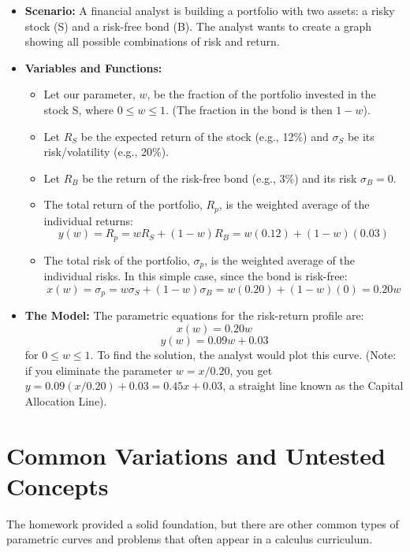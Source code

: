 \documentclass{article}
\begin{document}
\begin{itemize}
    \item \textbf{Scenario:} A financial analyst is building a portfolio with two assets: a risky stock (S) and a risk-free bond (B). The analyst wants to create a graph showing all possible combinations of risk and return.

    \item \textbf{Variables and Functions:}
        \begin{itemize}
            \item Let our parameter, $w$, be the fraction of the portfolio invested in the stock S, where $0 \le w \le 1$. (The fraction in the bond is then $1-w$).
            \item Let $R_S$ be the expected return of the stock (e.g., 12\%) and $\sigma_S$ be its risk/volatility (e.g., 20\%).
            \item Let $R_B$ be the return of the risk-free bond (e.g., 3\%) and its risk $\sigma_B = 0$.
            \item The total return of the portfolio, $R_p$, is the weighted average of the individual returns:
            \[ y(w) = R_p = w R_S + (1-w) R_B = w(0.12) + (1-w)(0.03) \]
            \item The total risk of the portfolio, $\sigma_p$, is the weighted average of the individual risks. In this simple case, since the bond is risk-free:
            \[ x(w) = \sigma_p = w \sigma_S + (1-w) \sigma_B = w(0.20) + (1-w)(0) = 0.20w \]
        \end{itemize}

    \item \textbf{The Model:} The parametric equations for the risk-return profile are:
    \[ x(w) = 0.20w \]
    \[ y(w) = 0.09w + 0.03 \]
    for $0 \le w \le 1$. To find the solution, the analyst would plot this curve. (Note: if you eliminate the parameter $w=x/0.20$, you get $y = 0.09(x/0.20) + 0.03 = 0.45x + 0.03$, a straight line known as the Capital Allocation Line).
\end{itemize}

\part*{Common Variations and Untested Concepts}

The homework provided a solid foundation, but there are other common types of parametric curves and problems that often appear in a calculus curriculum.
\end{document}
